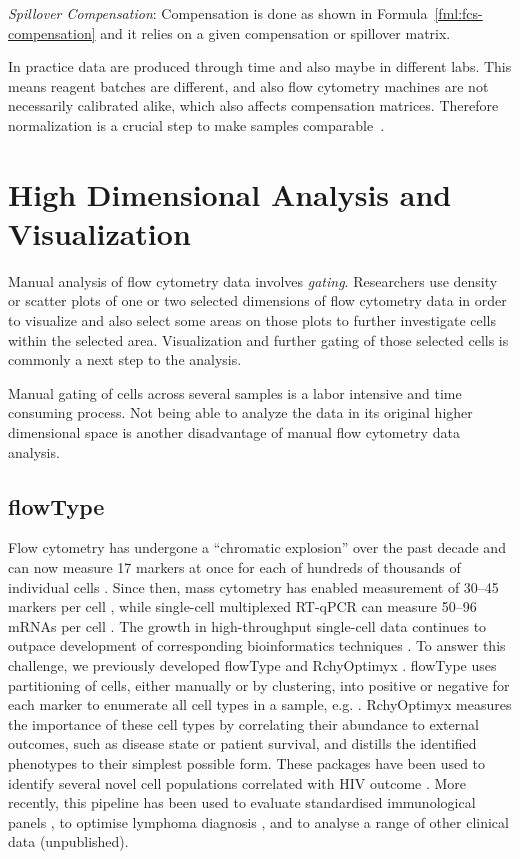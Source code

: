 \emph{Spillover Compensation}: Compensation is done as shown in Formula~\ref{fml:fcs-compensation} and it relies on a given compensation or spillover matrix.

In practice data are produced through time and also maybe in different labs. This means reagent batches are different, and also flow cytometry machines are not necessarily calibrated alike, which also affects compensation matrices. Therefore normalization is a crucial step to make samples comparable~\cite{fcs-normalization}.

\section{High Dimensional Analysis and Visualization}
Manual analysis of flow cytometry data involves \emph{gating}. Researchers use density or scatter plots of one or two selected dimensions  of flow cytometry data in order to visualize and also select some areas on those plots to further investigate cells within the selected area. Visualization and further gating of those selected cells is commonly a next step to the analysis.

Manual gating of cells across several samples is a labor intensive and time consuming process. Not being able to analyze the data in its original higher dimensional space is another disadvantage of manual flow cytometry data analysis.


\subsection{flowType}
Flow cytometry has undergone a ``chromatic explosion'' over the past decade and can now measure 17 markers at once for each of hundreds of thousands of individual cells \cite{Chattopadhyay2008}.
Since then, mass cytometry has enabled measurement of 30--45 markers per cell \cite{Bendall2012a}, while single-cell multiplexed RT-qPCR can measure 50--96 mRNAs per cell \cite{White2011}. 
The growth in high-throughput single-cell data continues to outpace development of corresponding bioinformatics techniques \cite{Chattopadhyay2008}.
To answer this challenge, we previously developed flowType \cite{Aghaeepour2012} and RchyOptimyx \cite{Aghaeepour2012a}. 
flowType uses partitioning of cells, either manually or by clustering, into positive or negative for each marker to enumerate all cell types in a sample, e.g. \cite{Aghaeepour2013Critical}.
RchyOptimyx measures the importance of these cell types by correlating their abundance to external outcomes, such as disease state or patient survival, and distills the identified phenotypes to their simplest possible form. 
These packages have been used to identify several novel cell populations correlated with HIV outcome \cite{Aghaeepour2012}. 
More recently, this pipeline has been used to evaluate standardised immunological panels \cite{Villanovaa2013Computational}, to optimise lymphoma diagnosis \cite{Craig2013Computational}, and to analyse a range of other clinical data (unpublished).

